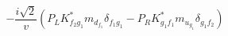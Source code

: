 %
\begin{dmath*}
%
  -  \frac{i \sqrt{2}}{v} \left(P_L K_{f_2 g_1}^* m_{d_{f_1}} \delta_{f_1 g_1} - P_R K_{g_1 f_1}^* m_{u_{g_1}} \delta_{g_1 f_2}\right)
%
\end{dmath*}
%
